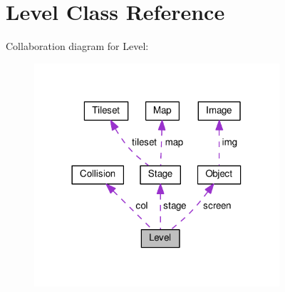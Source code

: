 \hypertarget{classLevel}{}\section{Level Class Reference}
\label{classLevel}


Collaboration diagram for Level\+:\nopagebreak
\begin{figure}[H]
\begin{center}
\leavevmode
\includegraphics[width=258pt]{classLevel__coll__graph}
\end{center}
\end{figure}
